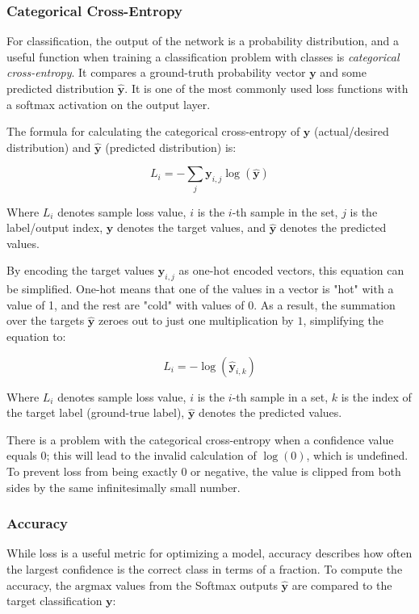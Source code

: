 \documentclass[a4paper]{article}
\newcommand{\vect}[1]{\bm{#1}}
\begin{document}
\subsubsection*{Categorical Cross-Entropy}
For classification, the output of the network is a probability distribution, and a useful function when training a classification problem with classes is \emph{categorical cross-entropy}. It compares a ground-truth probability vector $\vect{y}$ and some predicted distribution $\vect{\hat{y}}$. It is one of the most commonly used loss functions with a softmax activation on the output layer.

The formula for calculating the categorical cross-entropy of $\vect{y}$ (actual/desired distribution) and $\vect{\hat{y}}$ (predicted distribution) is:

\begin{equation*}
    L_i = -\sum_{j} \vect{y}_{i,j} \log({\vect{\hat{y}}})
\end{equation*}

Where $L_i$ denotes sample loss value, $i$ is the $i$-th sample in the set, $j$ is the label/output index, $\vect{y}$ denotes the target values, and $\vect{\hat{y}}$ denotes the predicted values.

By encoding the target values $\vect{y}_{i,j}$ as one-hot encoded vectors, this equation can be simplified. One-hot means that one of the values in a vector is "hot" with a value of 1, and the rest are "cold" with values of 0. As a result, the summation over the targets $\vect{\hat{y}}$ zeroes out to just one multiplication by $1$, simplifying the equation to:

\begin{equation*}
    L_i = -\log(\vect{\hat{y}}_{i,k})
\end{equation*}

Where $L_i$ denotes sample loss value, $i$ is the $i$-th sample in a set, $k$ is the index of the target label (ground-true label), $\vect{\hat{y}}$ denotes the predicted values.

There is a problem with the categorical cross-entropy when a confidence value equals $0$; this will 
lead to the invalid calculation of $\log(0)$, which is undefined. To prevent loss from being exactly $0$ or negative, the value is clipped from both sides by the same infinitesimally small number.

\subsubsection*{Accuracy}
While loss is a useful metric for optimizing a model, accuracy describes how often the largest 
confidence is the correct class in terms of a fraction. To compute the accuracy, the $\text{argmax}$ values from the Softmax outputs $\vect{\hat{y}}$ are compared to the target classification $\vect{y}$:
\end{document}
